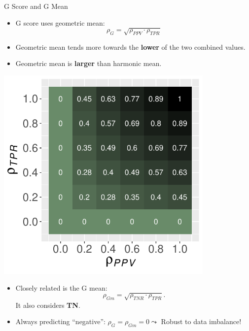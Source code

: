 \documentclass[11pt,compress,t,notes=noshow, xcolor=table]{beamer}
\begin{document}
\begin{frame}{G Score and G Mean}
	\footnotesize{
    	\begin{minipage}[c]{0.49\textwidth}
        	\begin{itemize}
        		\item G score uses geometric mean: 
        		$$\rho_{G} = \sqrt{\rho_{PPV} \cdot \rho_{TPR}}$$

        		\item Geometric mean tends more towards the \textbf{lower} of the two combined values.
                \item Geometric mean is \textbf{larger} than harmonic mean.
        	\end{itemize}
        \end{minipage}
        \begin{minipage}[c]{0.49\textwidth}
        	\centering
        	\includegraphics[width=0.8\textwidth]{figure/g_score_plot.pdf}
        \end{minipage}

        \begin{itemize}
        	\item Closely related is the G mean:
        	$$\rho_{Gm} = \sqrt{\rho_{TNR} \cdot \rho_{TPR}}.$$
        	It also considers \textbf{TN}.
    
        	\item Always predicting \enquote{negative}: $\rho_{G} = \rho_{Gm}  = 0 \leadsto$ Robust to data imbalance!
        \end{itemize}
}
\end{frame}
\end{document}
